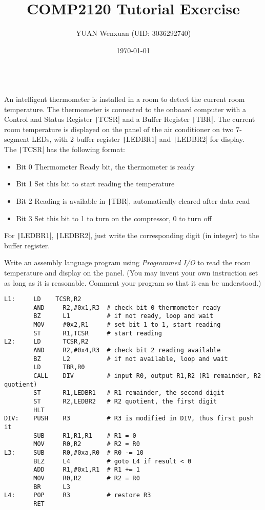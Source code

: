 \documentclass[answers]{exam}
\title{COMP2120 Tutorial Exercise}
\author{YUAN Wenxuan (UID: 3036292740)}
\date{\today}
\begin{document}
\maketitle

\begin{questions}

     \\
    An intelligent thermometer is installed in a room to detect the current room temperature.
    The thermometer is connected to the onboard computer with a Control and Status Register \texttt|TCSR| and a Buffer Register \texttt|TBR|.
    The current room temperature is displayed on the panel of the air conditioner on two 7-segment LEDs, with 2 buffer register \texttt|LEDBR1| and \texttt|LEDBR2| for display.\\
    The \texttt|TCSR| has the following format:
    \begin{itemize}
        \item[] Bit 0   Thermometer Ready bit, the thermometer is ready
        \item[] Bit 1   Set this bit to start reading the temperature
        \item[] Bit 2   Reading is available in \texttt|TBR|, automatically cleared after data read
        \item[] Bit 3   Set this bit to 1 to turn on the compressor, 0 to turn off
    \end{itemize}

    For \texttt|LEDBR1|, \texttt|LEDBR2|, just write the corresponding digit (in integer) to the buffer register.

    Write an assembly language program using \textit{Programmed I/O} to read the room temperature and display on the panel. (You may invent your own instruction set as long as it is reasonable. Comment your program so that it can be understood.)

    \begin{solution}
        \begin{verbatim}
L1:     LD    TCSR,R2
        AND     R2,#0x1,R3  # check bit 0 thermometer ready
        BZ      L1          # if not ready, loop and wait
        MOV     #0x2,R1     # set bit 1 to 1, start reading
        ST      R1,TCSR     # start reading
L2:     LD      TCSR,R2     
        AND     R2,#0x4,R3  # check bit 2 reading available
        BZ      L2          # if not available, loop and wait
        LD      TBR,R0
        CALL    DIV         # input R0, output R1,R2 (R1 remainder, R2 quotient)
        ST      R1,LEDBR1   # R1 remainder, the second digit
        ST      R2,LEDBR2   # R2 quotient, the first digit
        HLT
DIV:    PUSH    R3          # R3 is modified in DIV, thus first push it
        SUB     R1,R1,R1    # R1 = 0
        MOV     R0,R2       # R2 = R0
L3:     SUB     R0,#0xa,R0  # R0 -= 10
        BLZ     L4          # goto L4 if result < 0
        ADD     R1,#0x1,R1  # R1 += 1
        MOV     R0,R2       # R2 = R0
        BR      L3
L4:     POP     R3          # restore R3
        RET
    \end{verbatim}
    \end{solution}


\end{questions}
\end{document}

